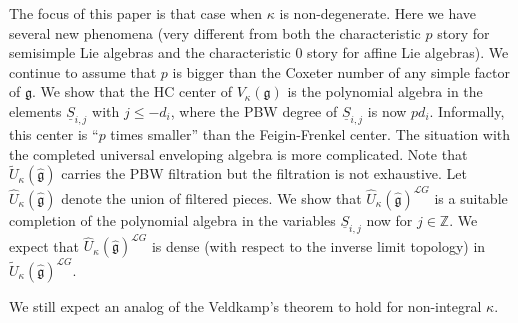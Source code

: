 \documentclass{amsart}
\theoremstyle{definition}
\newcommand{\sss}{\subsubsection{}}
\newcommand{\g}{\mathfrak{g}}
\newcommand{\hg}{\hat{\mathfrak{g}}}
\newcommand{\Z}{\mathbb{Z}}
\newcommand{\Loop}{\mathscr{L}}
\numberwithin{equation}{section}
\begin{document}
\sss \label{sss:introlast} The focus of this paper is that case when $\kappa$ is non-degenerate. Here we have several new phenomena (very different from both the characteristic $p$ story for semisimple Lie algebras and the characteristic $0$ 
story for affine Lie algebras). We continue to assume that $p$ is bigger than the Coxeter number of any simple factor of $\g$. We show that the HC center of $V_\kappa(\g)$ is the polynomial algebra in the elements $\underline{S}_{i,j}$ with $j\leqslant -d_i$, where the PBW degree of $\underline{S}_{i,j}$ is now $pd_i$. Informally, this center is ``$p$ times smaller'' than the Feigin-Frenkel center. The situation with the completed universal enveloping algebra is more complicated. Note that $\widetilde{U}_\kappa(\hg)$ carries the PBW filtration but the filtration is not exhaustive. Let $\widehat{U}_\kappa(\hg)$ denote the union of filtered pieces. We show that $\widehat{U}_\kappa(\hg)^{\Loop G}$
is a suitable completion of the polynomial algebra 
in the variables $\underline{S}_{i,j}$ now for $j\in \Z$. We expect that  $\widehat{U}_\kappa(\hg)^{\Loop G}$ is dense (with respect to the inverse limit topology) in 
$\widetilde{U}_\kappa(\hg)^{\Loop G}$.

 We still expect an analog of the Veldkamp's theorem to hold for non-integral $\kappa$.
\end{document}
